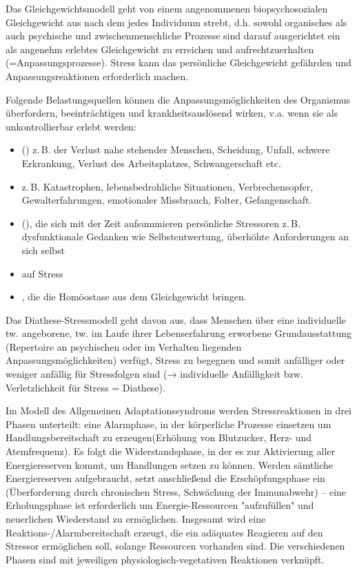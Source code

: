 \Text
{{\TxBeschreibung}}%
{%
Das Gleichgewichtsmodell geht von einem angenommenen biopsychosozialen Gleichgewicht aus nach dem jedes Individuum strebt, d.h. sowohl organisches als auch psychische und zwischenmenschliche Prozesse sind darauf ausgerichtet ein als angenehm erlebtes Gleichgewicht zu erreichen und aufrechtzuerhalten (=Anpassungsprozesse). Stress kann das persönliche Gleichgewicht gefährden und Anpassungsreaktionen erforderlich machen.

Folgende Belastungsquellen können die Anpassungsmöglichkeiten des
Organismus  überfordern, beeinträchtigen und krankheitsauslösend wirken, v.a. wenn sie als unkontrollierbar erlebt werden:

\begin{itemize}
  \item {} ()
  z.\,B. der Verlust nahe stehender Menschen, Scheidung,
  Unfall, schwere Erkrankung, Verlust des Arbeitsplatzes,
  Schwangerschaft etc.
  \item {}
  z.\,B. Katastrophen, lebensbedrohliche Situationen,
  Verbrechensopfer, Gewalterfahrungen, emotionaler
  Missbrauch, Folter, Gefangenschaft.
  \item {} (), die sich mit der Zeit aufsummieren persönliche
  Stressoren z.\,B. dysfunktionale Gedanken wie
  Selbstentwertung, überhöhte Anforderungen an sich selbst
  \item {} auf Stress
  \item {}, die die Homöostase
  aus dem Gleichgewicht bringen.
\end{itemize}

Das Diathese-Stressmodell geht davon aus, dass Menschen über eine individuelle tw. angeborene, tw. im Laufe ihrer Lebenserfahrung erworbene Grundausstattung (Repertoire an psychischen oder im Verhalten liegenden Anpassungsmöglichkeiten) verfügt, Stress zu begegnen und somit anfälliger oder weniger anfällig für Stressfolgen sind (→ individuelle Anfälligkeit bzw. Verletzlichkeit für Stress = Diathese). 

Im Modell des Allgemeinen Adaptationssyndroms werden Stressreaktionen in drei Phasen unterteilt: eine Alarmphase, in der körperliche Prozesse einsetzen um Handlungsbereitschaft zu erzeugen(Erhöhung von Blutzucker, Herz- und Atemfrequenz). Es folgt die Widerstandsphase, in der es zur Aktivierung aller Energiereserven kommt, um Handlungen setzen zu können. Werden sämtliche Energiereserven aufgebraucht, setzt anschließend die Erschöpfungsphase ein (Überforderung durch chronischen Stress, Schwächung der Immunabwehr) – eine Erholungsphase ist erforderlich um Energie-Ressourcen "aufzufüllen" und neuerlichen Wiederstand zu ermöglichen. Insgesamt wird eine Reaktions-/Alarmbereitschaft erzeugt, die ein adäquates Reagieren auf den Stressor ermöglichen soll, solange
Ressourcen vorhanden sind. Die verschiedenen Phasen sind mit jeweiligen
physiologisch-vegetativen Reaktionen verknüpft. 

}
